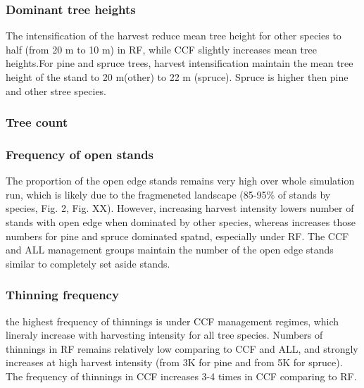 \documentclass[]{elsarticle} %
\begin{document}
\subsubsection{Dominant tree heights}\label{dominant-tree-heights}

The intensification of the harvest reduce mean tree height for other
species to half (from 20 m to 10 m) in RF, while CCF slightly increases
mean tree heights.For pine and spruce trees, harvest intensification
maintain the mean tree height of the stand to 20 m(other) to 22 m
(spruce). Spruce is higher then pine and other stree species.

\subsubsection{Tree count}\label{tree-count}

\subsubsection{Frequency of open stands}\label{frequency-of-open-stands}

The proportion of the open edge stands remains very high over whole
simulation run, which is likely due to the fragmeneted landscape
(85-95\% of stands by species, Fig. 2, Fig. XX). However, increasing
harvest intensity lowers number of stands with open edge when dominated
by other species, whereas increases those numbers for pine and spruce
dominated spatnd, especially under RF. The CCF and ALL management groups
maintain the number of the open edge stands similar to completely set
aside stands.

\subsubsection{Thinning frequency}\label{thinning-frequency}

the highest frequency of thinnings is under CCF management regimes,
which lineraly increase with harvesting intensity for all tree species.
Numbers of thinnings in RF remains relatively low comparing to CCF and
ALL, and strongly increases at high harvest intensity (from 3K for pine
and from 5K for spruce). The frequency of thinnings in CCF increases 3-4
times in CCF comparing to RF.
\end{document}
